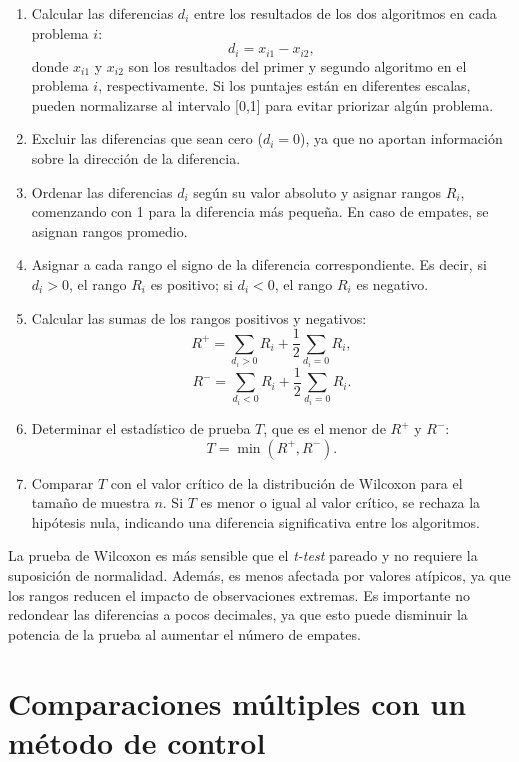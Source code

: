 \begin{enumerate}
    \item Calcular las diferencias $d_i$ entre los resultados de los dos algoritmos en cada problema $i$:
    \[
    d_i = x_{i1} - x_{i2},
    \]
    donde $x_{i1}$ y $x_{i2}$ son los resultados del primer y segundo algoritmo en el problema $i$, respectivamente. Si los puntajes están en diferentes escalas, pueden normalizarse al intervalo [0,1] para evitar priorizar algún problema.

    \item Excluir las diferencias que sean cero ($d_i = 0$), ya que no aportan información sobre la dirección de la diferencia.

    \item Ordenar las diferencias $d_i$ según su valor absoluto y asignar rangos $R_i$, comenzando con 1 para la diferencia más pequeña. En caso de empates, se asignan rangos promedio.

    \item Asignar a cada rango el signo de la diferencia correspondiente. Es decir, si $d_i > 0$, el rango $R_i$ es positivo; si $d_i < 0$, el rango $R_i$ es negativo.

    \item Calcular las sumas de los rangos positivos y negativos:
    \[
    R^+ = \sum_{d_i > 0} R_i + \frac{1}{2} \sum_{d_i = 0} R_i,
    \]
    \[
    R^- = \sum_{d_i < 0} R_i + \frac{1}{2} \sum_{d_i = 0} R_i.
    \]

    \item Determinar el estadístico de prueba $T$, que es el menor de $R^+$ y $R^-$:
    \[
    T = \min(R^+, R^-).
    \]

    \item Comparar $T$ con el valor crítico de la distribución de Wilcoxon para el tamaño de muestra $n$. Si $T$ es menor o igual al valor crítico, se rechaza la hipótesis nula, indicando una diferencia significativa entre los algoritmos.
\end{enumerate}

La prueba de Wilcoxon es más sensible que el \textit{t-test} pareado y no requiere la suposición de normalidad. Además, es menos afectada por valores atípicos, ya que los rangos reducen el impacto de observaciones extremas. Es importante no redondear las diferencias a pocos decimales, ya que esto puede disminuir la potencia de la prueba al aumentar el número de empates.

\section{Comparaciones múltiples con un método de control}
\label{sec:comparaciones_multiples}

